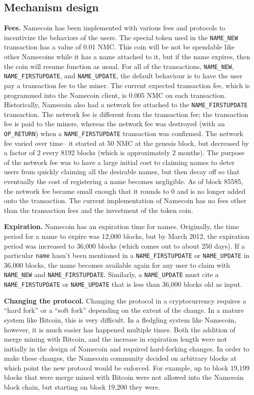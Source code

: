\subsection{Mechanism design}


{\bf Fees.}
Namecoin has been implemented with various fees and protocols to incentivize the behaviors of the users. The special token used in the {\tt NAME\_NEW} transaction has a value of 0.01 NMC. This coin will be not be spendable like other Namecoins while it has a name attached to it, but if the name expires, then the coin will resume function as usual. For all of the transactions, {\tt NAME\_NEW}, {\tt NAME\_FIRSTUPDATE}, and {\tt NAME\_UPDATE}, the default behaviour is to have the user pay a transaction fee to the miner. The current expected transaction fee, which is programmed into the Namecoin client, is 0.005 NMC on each transaction. Historically, Namecoin also had a network fee attached to the {\tt NAME\_FIRSTUPDATE} transaction. The network fee is different from the transaction fee; the transaction fee is paid to the miners, whereas the network fee was destroyed (with an {\tt OP\_RETURN}) when a {\tt NAME\_FIRSTUPDATE} transaction was confirmed. The network fee varied over time-- it started at 50 NMC at the genesis block, but decreased by a factor of 2 every 8192 blocks (which is approximately 2 months). The purpose of the network fee was to have a large initial cost to claiming names to deter users from quickly claiming all the desirable names, but then decay off so that eventually the cost of registering a name becomes negligible. As of block 85585, the network fee became small enough that it rounds to 0 and is no longer added onto the transaction. The current implementation of Namecoin has no fees other than the transaction fees and the investment of the token coin.

{\bf Expiration.}
Namecoin has an expiration time for names. Originally, the time period for a name to expire was 12,000 blocks, but by March 2012, the expiration period was increased to 36,000 blocks (which comes out to about 250 days). If a particular {\tt name} hasn't been mentioned in a {\tt NAME\_FIRSTUPDATE} or {\tt NAME\_UPDATE} in 36,000 blocks, the name becomes available again for any user to claim with {\tt NAME\_NEW} and {\tt NAME\_FIRSTUPDATE}. Similarly, a {\tt NAME\_UPDATE} must cite a {\tt NAME\_FIRSTUPDATE} or {\tt NAME\_UPDATE} that is less than 36,000 blocks old as input.

{\bf Changing the protocol.}
Changing the protocol in a cryptocurrency requires a ``hard fork'' or a ``soft fork'' depending on the extent of the change. In a mature system like Bitcoin, this is very difficult. In a fledgling system like Namecoin, however, it is much easier has happened multiple times. Both the addition of merge mining with Bitcoin, and the increase in expiration length were not initially in the design of Namecoin and required hard-forking changes. In order to make these changes, the Namecoin community decided on arbitrary blocks at which point the new protocol would be enforced. For example, up to block 19,199 blocks that were merge mined with Bitcoin were not allowed into the Namceoin block chain, but starting on block 19,200 they were. 
 
